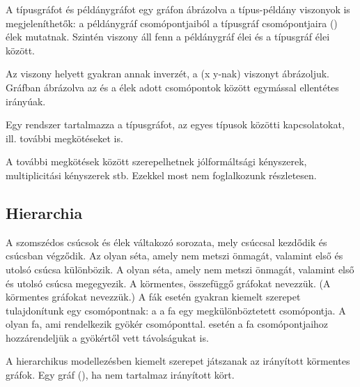 A típusgráfot és példánygráfot egy gráfon ábrázolva a típus-példány viszonyok is megjeleníthetők: a példánygráf csomópontjaiból a típusgráf csomópontjaira  () élek mutatnak. Szintén  viszony áll fenn a példánygráf élei és a típusgráf élei között.%

\begin{megjegyzes}
	Az  viszony helyett gyakran annak inverzét, a  (x  y-nak) viszonyt ábrázoljuk. Gráfban ábrázolva az  és a  élek adott csomópontok között egymással ellentétes irányúak.
\end{megjegyzes}


\begin{definicio}
	Egy rendszer  tartalmazza a típusgráfot, az egyes típusok közötti kapcsolatokat, ill. további megkötéseket is.

	\begin{megjegyzes}
		A további megkötések között szerepelhetnek jólformáltsági kényszerek, multiplicitási kényszerek stb. Ezekkel most nem foglalkozunk részletesen.
	\end{megjegyzes}
\end{definicio}

\subsection{Hierarchia}

\begin{kisdefiniciok}
	A  szomszédos csúcsok és élek váltakozó sorozata, mely csúccsal kezdődik és csúcsban végződik. %
	Az  olyan séta, amely nem metszi önmagát, valamint első és utolsó csúcsa különbözik. A  olyan séta, amely nem metszi önmagát, valamint első és utolsó csúcsa megegyezik. %
	A körmentes, összefüggő gráfokat  nevezzük. (A körmentes gráfokat  nevezzük.)
	A fák esetén gyakran kiemelt szerepet tulajdonítunk egy csomópontnak: a  a fa egy megkülönböztetett csomópontja. A  olyan fa, ami rendelkezik gyökér csomóponttal.  esetén a fa csomópontjaihoz hozzárendeljük a gyökértől vett távolságukat is.

	A hierarchikus modellezésben kiemelt szerepet játszanak az irányított körmentes gráfok. Egy gráf  (), ha nem tartalmaz irányított kört.
\end{kisdefiniciok}

